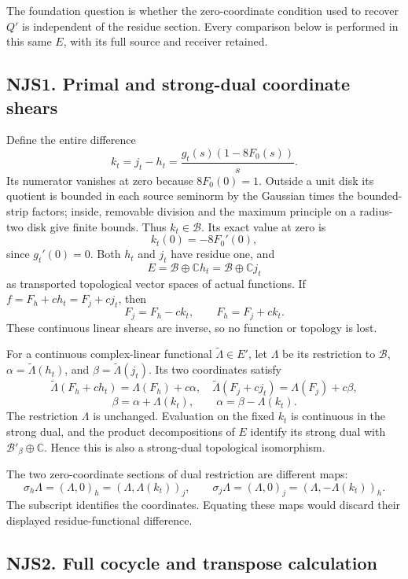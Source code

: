 The foundation question is whether the zero-coordinate condition used to
recover \(Q'\) is independent of the residue section. Every comparison
below is performed in this same \(E\), with its full source and receiver
retained.

\subsection{NJS1. Primal and strong-dual coordinate
shears}\label{njs1.-primal-and-strong-dual-coordinate-shears}

Define the entire difference \[
k_t=j_t-h_t=\frac{g_t(s)(1-8F_0(s))}s.
\tag{NJS1.1}
\] Its numerator vanishes at zero because \(8F_0(0)=1\). Outside a unit
disk its quotient is bounded in each source seminorm by the Gaussian
times the bounded-strip factors; inside, removable division and the
maximum principle on a radius-two disk give finite bounds. Thus
\(k_t\in\mathcal B\). Its exact value at zero is \[
k_t(0)=-8F_0'(0),
\tag{NJS1.2}
\] since \(g_t'(0)=0\). Both \(h_t\) and \(j_t\) have residue one, and
\[
E=\mathcal B\oplus\mathbb C h_t=\mathcal B\oplus\mathbb C j_t
\tag{NJS1.3}
\] as transported topological vector spaces of actual functions. If
\(f=F_h+ch_t=F_j+cj_t\), then \[
F_j=F_h-ck_t,\qquad F_h=F_j+ck_t.
\tag{NJS1.4}
\] These continuous linear shears are inverse, so no function or
topology is lost.

For a continuous complex-linear functional \(\widetilde\Lambda\in E'\),
let \(\Lambda\) be its restriction to \(\mathcal B\),
\(\alpha=\widetilde\Lambda(h_t)\), and \(\beta=\widetilde\Lambda(j_t)\).
Its two coordinates satisfy \[
\widetilde\Lambda(F_h+ch_t)=\Lambda(F_h)+c\alpha,
\quad\widetilde\Lambda(F_j+cj_t)=\Lambda(F_j)+c\beta,
\] \[
\boxed{\beta=\alpha+\Lambda(k_t),\qquad\alpha=\beta-\Lambda(k_t).}
\tag{NJS1.5}
\] The restriction \(\Lambda\) is unchanged. Evaluation on the fixed
\(k_t\) is continuous in the strong dual, and the product decompositions
of \(E\) identify its strong dual with
\(\mathcal B'_\beta\oplus\mathbb C\). Hence this is also a strong-dual
topological isomorphism.

The two zero-coordinate sections of dual restriction are different maps:
\[
\sigma_h\Lambda=(\Lambda,0)_h=(\Lambda,\Lambda(k_t))_j,
\qquad
\sigma_j\Lambda=(\Lambda,0)_j=(\Lambda,-\Lambda(k_t))_h.
\tag{NJS1.6}
\] The subscript identifies the coordinates. Equating these maps would
discard their displayed residue-functional difference.

\subsection{NJS2. Full cocycle and transpose
calculation}\label{njs2.-full-cocycle-and-transpose-calculation}

